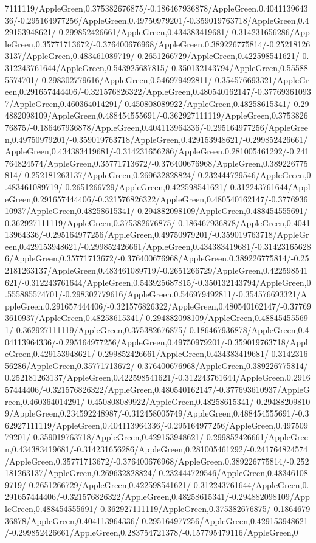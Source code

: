 {\begin{tikzternal}
{7111119/AppleGreen,0.375382676875/-0.186467936878/AppleGreen,0.404113964336/-0.295164977256/AppleGreen,0.49750979201/-0.359019763718/AppleGreen,0.429153948621/-0.299852426661/AppleGreen,0.434383419681/-0.314231656286/AppleGreen,0.35771713672/-0.376400676968/AppleGreen,0.389226775814/-0.252181263137/AppleGreen,0.483461089719/-0.2651266729/AppleGreen,0.422598541621/-0.312243761644/AppleGreen,0.543925687815/-0.350132143794/AppleGreen,0.555885574701/-0.298302779616/AppleGreen,0.546979492811/-0.354576693321/AppleGreen,0.291657444406/-0.321576826322/AppleGreen,0.480540162147/-0.377693610937/AppleGreen,0.460364014291/-0.450808089922/AppleGreen,0.48258615341/-0.294882098109/AppleGreen,0.488454555691/-0.362927111119/AppleGreen,0.375382676875/-0.186467936878/AppleGreen,0.404113964336/-0.295164977256/AppleGreen,0.49750979201/-0.359019763718/AppleGreen,0.429153948621/-0.299852426661/AppleGreen,0.434383419681/-0.314231656286/AppleGreen,0.281005461292/-0.241764824574/AppleGreen,0.35771713672/-0.376400676968/AppleGreen,0.389226775814/-0.252181263137/AppleGreen,0.269632828824/-0.232444729546/AppleGreen,0.483461089719/-0.2651266729/AppleGreen,0.422598541621/-0.312243761644/AppleGreen,0.291657444406/-0.321576826322/AppleGreen,0.480540162147/-0.377693610937/AppleGreen,0.48258615341/-0.294882098109/AppleGreen,0.488454555691/-0.362927111119/AppleGreen,0.375382676875/-0.186467936878/AppleGreen,0.404113964336/-0.295164977256/AppleGreen,0.49750979201/-0.359019763718/AppleGreen,0.429153948621/-0.299852426661/AppleGreen,0.434383419681/-0.314231656286/AppleGreen,0.35771713672/-0.376400676968/AppleGreen,0.389226775814/-0.252181263137/AppleGreen,0.483461089719/-0.2651266729/AppleGreen,0.422598541621/-0.312243761644/AppleGreen,0.543925687815/-0.350132143794/AppleGreen,0.555885574701/-0.298302779616/AppleGreen,0.546979492811/-0.354576693321/AppleGreen,0.291657444406/-0.321576826322/AppleGreen,0.480540162147/-0.377693610937/AppleGreen,0.48258615341/-0.294882098109/AppleGreen,0.488454555691/-0.362927111119/AppleGreen,0.375382676875/-0.186467936878/AppleGreen,0.404113964336/-0.295164977256/AppleGreen,0.49750979201/-0.359019763718/AppleGreen,0.429153948621/-0.299852426661/AppleGreen,0.434383419681/-0.314231656286/AppleGreen,0.35771713672/-0.376400676968/AppleGreen,0.389226775814/-0.252181263137/AppleGreen,0.422598541621/-0.312243761644/AppleGreen,0.291657444406/-0.321576826322/AppleGreen,0.480540162147/-0.377693610937/AppleGreen,0.460364014291/-0.450808089922/AppleGreen,0.48258615341/-0.294882098109/AppleGreen,0.234592248987/-0.312458005749/AppleGreen,0.488454555691/-0.362927111119/AppleGreen,0.404113964336/-0.295164977256/AppleGreen,0.49750979201/-0.359019763718/AppleGreen,0.429153948621/-0.299852426661/AppleGreen,0.434383419681/-0.314231656286/AppleGreen,0.281005461292/-0.241764824574/AppleGreen,0.35771713672/-0.376400676968/AppleGreen,0.389226775814/-0.252181263137/AppleGreen,0.269632828824/-0.232444729546/AppleGreen,0.483461089719/-0.2651266729/AppleGreen,0.422598541621/-0.312243761644/AppleGreen,0.291657444406/-0.321576826322/AppleGreen,0.48258615341/-0.294882098109/AppleGreen,0.488454555691/-0.362927111119/AppleGreen,0.375382676875/-0.186467936878/AppleGreen,0.404113964336/-0.295164977256/AppleGreen,0.429153948621/-0.299852426661/AppleGreen,0.283754721378/-0.157795479116/AppleGreen,0}
\end{tikzternal}}
